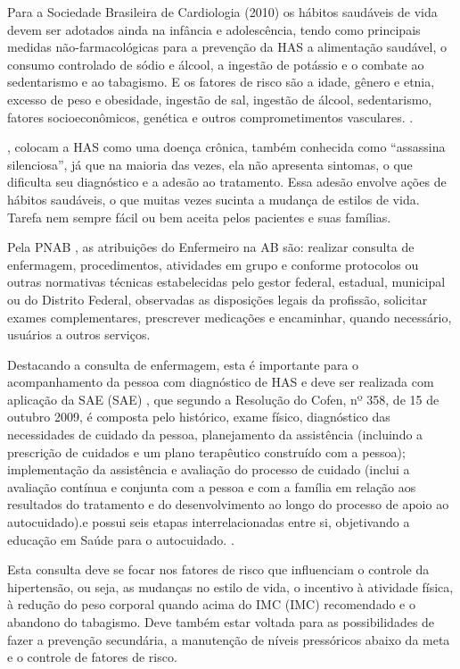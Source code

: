 Para a Sociedade Brasileira de Cardiologia (2010) os hábitos saudáveis de vida devem ser adotados ainda na infância e adolescência, tendo como principais medidas não-farmacológicas para a prevenção da HAS a alimentação saudável, o consumo controlado de sódio e álcool, a ingestão de potássio e o combate ao sedentarismo e ao tabagismo. E os fatores de risco são a idade, gênero e etnia, excesso de peso e obesidade, ingestão de sal, ingestão de álcool, sedentarismo, fatores socioeconômicos, genética e outros comprometimentos vasculares. \cite{hipertenso}.

\cite{da2012associaccao}, colocam a HAS como uma doença crônica, também conhecida como ``assassina silenciosa'', já que na maioria das vezes, ela não apresenta sintomas, o que dificulta seu diagnóstico e a adesão ao tratamento. Essa adesão envolve ações de hábitos saudáveis, o que muitas vezes sucinta a mudança de estilos de vida. Tarefa nem sempre fácil ou bem aceita pelos pacientes e suas famílias. 

Pela PNAB \cite{ministerio2012politica}, as atribuições do Enfermeiro na AB são: realizar consulta de enfermagem, procedimentos, atividades em grupo e conforme protocolos ou outras normativas técnicas estabelecidas pelo gestor federal, estadual, municipal ou do Distrito Federal, observadas as disposições legais da profissão, solicitar exames complementares, prescrever medicações e encaminhar, quando necessário, usuários a outros serviços. 

Destacando a consulta de enfermagem, esta é importante para o acompanhamento da pessoa com diagnóstico de HAS e deve ser realizada com aplicação da \acrlong{SAE} (\acrshort{SAE}) \cite{atencaobasica37}, que segundo a Resolução do Cofen, nº 358, de 15 de outubro 2009, é composta pelo histórico, exame físico, diagnóstico das necessidades de cuidado da pessoa, planejamento da assistência (incluindo a prescrição de cuidados e um plano terapêutico construído com a pessoa); implementação da assistência e avaliação do processo de cuidado (inclui a avaliação contínua e conjunta com a pessoa e com a família em relação aos resultados do tratamento e do desenvolvimento ao longo do processo de apoio ao autocuidado).e possui seis etapas interrelacionadas entre si, objetivando a educação em Saúde para o autocuidado. \cite{de2009resoluccao}.

Esta consulta deve se focar nos fatores de risco que influenciam o controle da hipertensão, ou seja, as mudanças no estilo de vida, o incentivo à atividade física, à redução do peso corporal quando acima do \acrlong{IMC} (\acrshort{IMC}) recomendado e o abandono do tabagismo. Deve também estar voltada para as possibilidades de fazer a prevenção secundária, a manutenção de níveis pressóricos abaixo da meta e o controle de fatores de risco.

